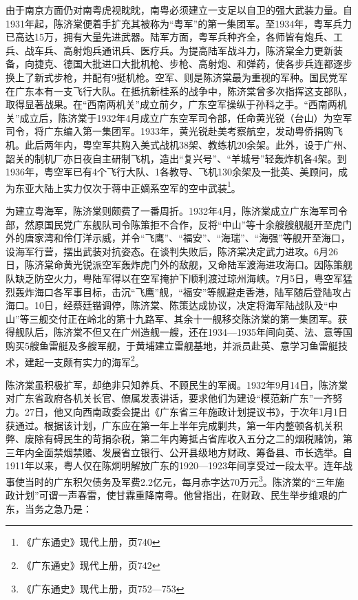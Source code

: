 由于南京方面仍对南粤虎视眈眈，南粤必须建立一支足以自卫的强大武装力量。自1931年起，陈济棠便着手扩充其被称为“粤军”的第一集团军。至1934年，粤军兵力已高达15万，拥有大量先进武器。陆军方面，粤军兵种齐全，各师皆有炮兵、工兵、战车兵、高射炮兵通讯兵、医疗兵。为提高陆军战斗力，陈济棠全力更新装备，向捷克、德国大批进口大批机枪、步枪、高射炮、和弹药，使各步兵连都逐步换上了新式步枪，并配有9挺机枪。空军、则是陈济棠最为重视的军种。国民党军在广东本有一支飞行大队。在抵抗新桂系的战争中，陈济棠曾多次指挥这支部队，取得显著战果。在“西南两机关”成立前夕，广东空军操纵于孙科之手。“西南两机关”成立后，陈济棠于1932年4月成立广东空军司令部，任命黄光锐（台山）为空军司令，将广东编入第一集团军。1933年，黄光锐赴美考察航空，发动粤侨捐购飞机。此后两年内，粤空军共购入美式战机38架、教练机20余架。此外，设于广州、韶关的制机厂亦日夜自主研制飞机，造出“复兴号”、“羊城号”轻轰炸机各4架。到1936年，粤空军已有4个飞行大队、1各教导、飞机130余架及一批英、美顾问，成为东亚大陆上实力仅次于蒋中正嫡系空军的空中武装\footnote{《广东通史》现代上册，页740}。

为建立粤海军，陈济棠则颇费了一番周折。1932年4月，陈济棠成立广东海军司令部，然原国民党广东舰队司令陈策拒不合作，反将“中山”等十余艘艘舰艇开至虎门外的唐家湾和伶仃洋示威，并令“飞鹰”、“福安”、“海瑞”、“海强”等舰开至海口，设海军行营，摆出武装对抗姿态。在谈判失败后，陈济棠决定武力进攻。6月26日，陈济棠命黄光锐派空军轰炸虎门外的敌舰，又命陆军渡海进攻海口。因陈策舰队缺乏防空火力，粤陆军得以在空军掩护下顺利渡过琼州海峡。7月5日，粤空军猛烈轰炸海口各军事目标，击沉“飞鹰”舰，“福安”等舰避走香港，陆军随后登陆攻占海口。10日，经蔡廷锴调停，陈济棠、陈策达成协议，决定将海军陆战队及“中山”等三舰交付正在岭北的第十九路军、其余十一舰移交陈济棠的第一集团军。获得舰队后，陈济棠不但又在广州造舰一艘，还在1934—1935年间向英、法、意等国购买5艘鱼雷艇及多艘军舰，于黄埔建立雷舰基地，并派员赴英、意学习鱼雷艇技术，建起一支颇有实力的海军\footnote{《广东通史》现代上册，页742}。

陈济棠虽积极扩军，却绝非只知养兵、不顾民生的军阀。1932年9月14日，陈济棠对广东省政府各机关长官、僚属发表讲话，要求他们为建设“模范新广东”一齐努力。27日，他又向西南政委会提出《广东省三年施政计划提议书》，于次年1月1日获通过。根据该计划，广东应在第一年上半年完成剿共，第一年内整顿各机关积弊、废除有碍民生的苛捐杂税，第二年内筹抵占省库收入五分之二的烟税赌饷，第三年内全面禁烟禁赌、发展省立银行、公开县级地方财政、筹备县、市长选举。自1911年以来，粤人仅在陈炯明解放广东的1920—1923年间享受过一段太平。连年战事使当时的广东积欠债务及军费2.2亿元，每月赤字达70万元\footnote{《广东通史》现代上册，页752—753}。陈济棠的“三年施政计划”可谓一声春雷，使甘霖重降南粤。他曾指出，在财政、民生举步维艰的广东，当务之急乃是：

